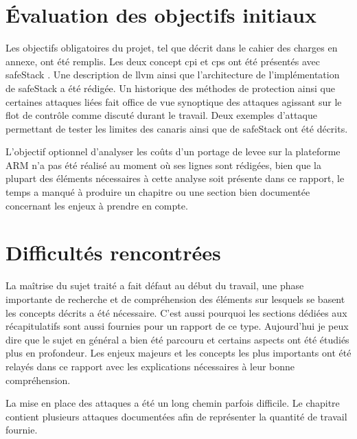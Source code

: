 \section{Évaluation des objectifs initiaux}

Les objectifs obligatoires du projet, tel que décrit dans le cahier des charges en
annexe, ont été remplis. Les deux concept \gls{cpi} et \gls{cps} ont été présentés
avec \og \gls{safeStack} \fg. Une description de \gls{llvm} ainsi que l'architecture
de l'implémentation de \og \gls{safeStack} \fg a été rédigée. Un historique des
méthodes de protection ainsi que certaines attaques liées fait office de vue
synoptique des attaques agissant sur le flot de contrôle comme discuté durant
le travail. Deux exemples d'attaque permettant de tester les limites des canaris
ainsi que de \og \gls{safeStack} \fg ont été décrits.

L'objectif optionnel d'analyser les coûts d'un portage de \gls{levee} sur la plateforme
ARM n'a pas été réalisé au moment où ses lignes sont rédigées, bien que la plupart
des éléments nécessaires à cette analyse soit présente dans ce rapport, le temps
a manqué à produire un chapitre ou une section bien documentée concernant les
enjeux à prendre en compte.

\newpage

\section{Difficultés rencontrées}

La maîtrise du sujet traité a fait défaut au début du travail, une phase importante
de recherche et de compréhension des éléments sur lesquels se basent les
concepts décrits a été nécessaire. C'est aussi pourquoi les sections dédiées aux
récapitulatifs sont aussi fournies pour un rapport de ce type. Aujourd'hui je peux
dire que le sujet en général a bien été parcouru et certains aspects ont été
étudiés plus en profondeur. Les enjeux majeurs et les concepts les plus importants
ont été relayés dans ce rapport avec les explications nécessaires à leur bonne
compréhension.

La mise en place des attaques a été un long chemin parfois difficile. Le chapitre
contient plusieurs attaques documentées afin de représenter la quantité de travail
fournie.

